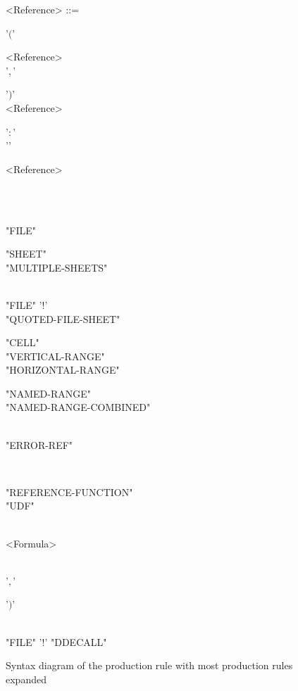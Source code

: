 \documentclass[conference]{IEEEtran}
\begin{document}
\begin{figure}
	\caption{Syntax diagram of the  production rule with most production rules expanded}
	\label{figure:Reference}
	\centering
	\begin{grammar}
		<Reference> ::= \begin{syntdiag}[\footnotesize\sdlengths]
		\begin{stack} '$($' \begin{rep} <Reference> \\  '$,$' \end{rep} '$)$'\\ <Reference> \begin{stack} '$:$' \\ '' \end{stack} <Reference> \\
		\begin{stack} \\ \begin{stack} \\ "FILE" \end{stack} \begin{stack} "SHEET" \\ "MULTIPLE-SHEETS" \end{stack} \\ "FILE" '$!$' \\ "QUOTED-FILE-SHEET" \end{stack}
		\begin{stack} \begin{stack} "CELL" \\ "VERTICAL-RANGE" \\ "HORIZONTAL-RANGE" \\ \begin{stack} "NAMED-RANGE" \\ "NAMED-RANGE-COMBINED" \end{stack} \\ "ERROR-REF" \end{stack} \\  \begin{stack} "REFERENCE-FUNCTION" \\ "UDF" \end{stack} \begin{rep} \begin{stack} \\ <Formula> \end{stack} \\  '$,$' \end{rep} '$)$'\end{stack}
		\\"FILE" '$!$' "DDECALL"
		\end{stack}
		\end{syntdiag}
	\end{grammar}
\end{figure}
\end{document}
